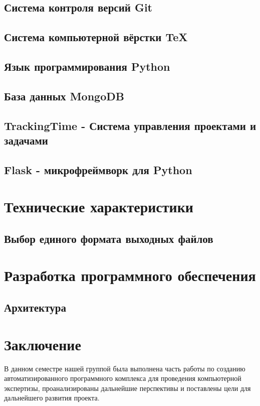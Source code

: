 \subsection{Система контроля версий Git}

\subsection{Система компьютерной вёрстки \TeX}

\subsection{Язык программирования Python}

\subsection{База данных MongoDB}

\subsection{TrackingTime - Система управления проектами и задачами}

\subsection{Flask - микрофреймворк для Python}


\section{Технические характеристики}

\subsection{Выбор единого формата выходных файлов}


\section{Разработка программного обеспечения}
\setcounter{figure}{0}
 
\subsection{Архитектура}


\newpage
\section*{Заключение}
В данном семестре нашей группой была выполнена часть работы по созданию автоматизированного программного комплекса для проведения компьютерной экспертизы, проанализированы дальнейшие перспективы и поставлены цели для дальнейшего развития проекта.
 
